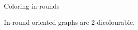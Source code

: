 \documentclass{beamer}
\begin{document}
\begin{frame}{Coloring in-rounds}

\begin{theorem}
In-round oriented graphs are 2-dicolourable.
\end{theorem}



\end{frame}
\end{document}
